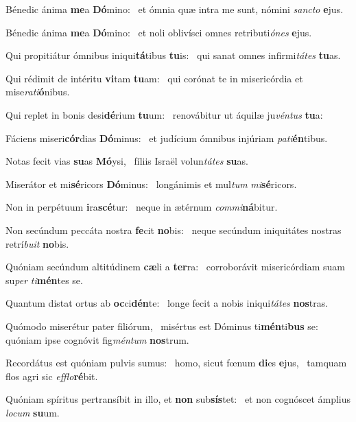 \item Bénedic ánima \textbf{me}a \textbf{Dó}mino:~\psstar{} et ómnia quæ intra me sunt, nómini \textit{sancto} \textbf{e}jus.
\item Bénedic ánima \textbf{me}a \textbf{Dó}mino:~\psstar{} et noli oblivísci omnes retributi\textit{ónes} \textbf{e}jus.
\item Qui propitiátur ómnibus iniqui\textbf{tá}tibus \textbf{tu}is:~\psstar{} qui sanat omnes infirmi\textit{tátes} \textbf{tu}as.
\item Qui rédimit de intéritu \textbf{vi}tam \textbf{tu}am:~\psstar{} qui corónat te in misericórdia et mise\textit{rati}\textbf{ó}nibus.
\item Qui replet in bonis desi\textbf{dé}rium \textbf{tu}um:~\psstar{} renovábitur ut áquilæ ju\textit{véntus} \textbf{tu}a:
\item Fáciens miseri\textbf{cór}dias \textbf{Dó}mi\-nus:~\psstar{} et judícium ómnibus injúriam \textit{pati}\textbf{én}tibus.
\item Notas fecit vias \textbf{su}as \textbf{Mó}ysi,~\psstar{} fíliis Israël volun\textit{tátes} \textbf{su}as.
\item Miserátor et mi\textbf{sé}ricors \textbf{Dó}minus:~\psstar{} longánimis et mul\textit{tum} \textit{mi}\textbf{sé}ricors.
\item Non in perpétuum \textbf{i}ra\textbf{scé}tur:~\psstar{} neque in ætérnum \textit{commi}\textbf{ná}bi\-tur.
\item Non secúndum peccáta nostra \textbf{fe}cit \textbf{no}bis:~\psstar{} neque secúndum iniquitátes nostras retrí\textit{buit} \textbf{no}bis.
\item Quóniam secúndum altitúdinem \textbf{cæ}li a \textbf{ter}ra:~\psstar{} corroborávit misericórdiam suam su\textit{per} \textit{ti}\textbf{mén}tes se.
\item Quantum distat ortus ab \textbf{oc}ci\textbf{dén}te:~\psstar{} longe fecit a nobis iniqui\textit{tátes} \textbf{nos}tras.
\item Quómodo miserétur pater filiórum,~\pscross{} misértus est Dóminus ti\textbf{mén}ti\textbf{bus} se:~\psstar{} quóniam ipse cognóvit fig\textit{méntum} \textbf{nos}trum.
\item Recordátus est quóniam pulvis sumus:~\pscross{} homo, sicut fœnum \textbf{di}es \textbf{e}jus,~\psstar{} tamquam flos agri sic \textit{efflo}\textbf{ré}bit.
\item Quóniam spíritus pertransíbit in illo, et \textbf{non} sub\textbf{sís}tet:~\psstar{} et non cognóscet ámplius \textit{locum} \textbf{su}um.
